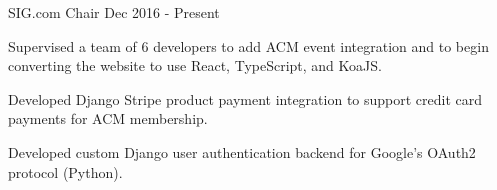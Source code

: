 \begin{cventries}
\cventry
  {SIG.com Chair} %
  {} %
  {} %
  {Dec 2016 - Present} %
  {
    \begin{cvitems} %
      \item {Supervised a team of 6 developers to add ACM event integration and to begin converting the website to use React, TypeScript, and KoaJS.}
      \item {Developed Django Stripe product payment integration to support credit card payments for ACM membership.}
      \item {Developed custom Django user authentication backend for Google's OAuth2 protocol (Python).}
    \end{cvitems}
  }




\end{cventries}
